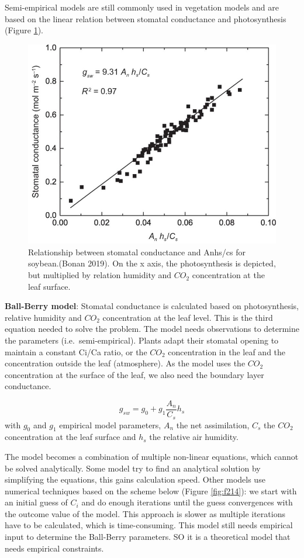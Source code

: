 \documentclass[12pt,oneside]{book}
\begin{document}
Semi-empirical models are still commonly used in vegetation models and
are based on the linear relation between stomatal conductance and
photosynthesis (Figure \ref{fig:f213}).

\begin{figure}

{\centering \includegraphics[width=0.8\linewidth]{figures/chap2/ball_berry} 

}

\caption{Relationship between stomatal conductance and Anhs/cs for soybean.(Bonan 2019). On the x axis, the photosynthesis is depicted, but multiplied by relation humidity and $CO_2$ concentration at the leaf surface.}\label{fig:f213}
\end{figure}

\textbf{Ball-Berry model}: Stomatal conductance is calculated based on
photosynthesis, relative humidity and \(CO_2\) concentration at the leaf
level. This is the third equation needed to solve the problem. The model
needs observations to determine the parameters (i.e.~semi-empirical).
Plants adapt their stomatal opening to maintain a constant Ci/Ca ratio,
or the \(CO_2\) concentration in the leaf and the concentration outside
the leaf (atmosphere). As the model uses the \(CO_2\) concentration at
the surface of the leaf, we also need the boundary layer conductance.

\[
g_{sw}=g_0 + g_1\frac{A_n}{C_s}h_s
\] with \(g_0\) and \(g_1\) empirical model parameters, \(A_n\) the net
assimilation, \(C_s\) the \(CO_2\) concentration at the leaf surface and
\(h_s\) the relative air humidity.

The model becomes a combination of multiple non-linear equations, which
cannot be solved analytically. Some model try to find an analytical
solution by simplifying the equations, this gains calculation speed.
Other models use numerical techniques based on the scheme below (Figure
\ref{fig:f214}): we start with an initial guess of \(C_i\) and do enough
iterations until the guess convergences with the outcome value of the
model. This approach is slower as multiple iterations have to be
calculated, which is time-consuming. This model still needs empirical
input to determine the Ball-Berry parameters. SO it is a theoretical
model that needs empirical constraints.
\end{document}
